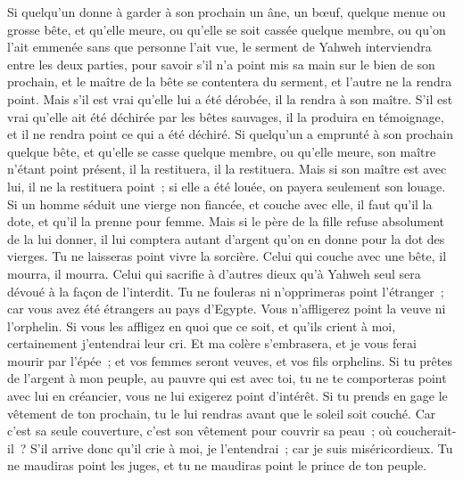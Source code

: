 \begin{multicols}{2}
Si quelqu'un donne à garder à son prochain un âne, un bœuf, quelque menue ou grosse bête, et qu'elle meure, ou qu'elle se soit cassée quelque membre, ou qu'on l'ait emmenée sans que personne l'ait vue,
le serment de Yahweh interviendra entre les deux parties, pour savoir s'il n'a point mis sa main sur le bien de son prochain, et le maître de la bête se contentera du serment, et l'autre ne la rendra point.
Mais s'il est vrai qu'elle lui a été dérobée, il la rendra à son maître.
S'il est vrai qu'elle ait été déchirée par les bêtes sauvages, il la produira en témoignage, et il ne rendra point ce qui a été déchiré.
Si quelqu'un a emprunté à son prochain quelque bête, et qu'elle se casse quelque membre, ou qu'elle meure, son maître n'étant point présent, il la restituera, il la restituera.
Mais si son maître est avec lui, il ne la restituera point~; si elle a été louée, on payera seulement son louage.
Si un homme séduit une vierge non fiancée, et couche avec elle, il faut qu'il la dote, et qu'il la prenne pour femme.
Mais si le père de la fille refuse absolument de la lui donner, il lui comptera autant d'argent qu'on en donne pour la dot des vierges.
Tu ne laisseras point vivre la sorcière.
Celui qui couche avec une bête, il mourra, il mourra.
Celui qui sacrifie à d'autres dieux qu'à Yahweh seul sera dévoué à la façon de l'interdit.
Tu ne fouleras ni n'opprimeras point l'étranger~; car vous avez été étrangers au pays d'Egypte.
Vous n'affligerez point la veuve ni l'orphelin.
Si vous les affligez en quoi que ce soit, et qu'ils crient à moi, certainement j'entendrai leur cri.
Et ma colère s'embrasera, et je vous ferai mourir par l'épée~; et vos femmes seront veuves, et vos fils orphelins.
Si tu prêtes de l'argent à mon peuple, au pauvre qui est avec toi, tu ne te comporteras point avec lui en créancier, vous ne lui exigerez point d'intérêt.
Si tu prends en gage le vêtement de ton prochain, tu le lui rendras avant que le soleil soit couché.
Car c'est sa seule couverture, c'est son vêtement pour couvrir sa peau~; où coucherait-il~? S'il arrive donc qu'il crie à moi, je l'entendrai~; car je suis miséricordieux.
Tu ne maudiras point les juges, et tu ne maudiras point le prince de ton peuple.

\end{multicols}
